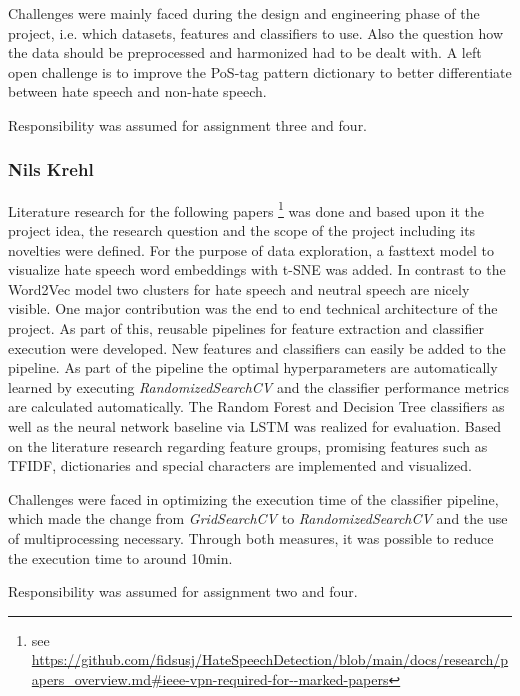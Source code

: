 Challenges were mainly faced during the design and engineering phase of the project, i.e. which datasets, features and classifiers to use. Also the question how the data should be preprocessed and harmonized had to be dealt with. A left open challenge is to improve the PoS-tag pattern dictionary to better differentiate between hate speech and non-hate speech. 

Responsibility was assumed for assignment three and four.

\subsubsection*{Nils Krehl}

Literature research for the following papers \footnote{see \url{https://github.com/fidsusj/HateSpeechDetection/blob/main/docs/research/papers_overview.md\#ieee-vpn-required-for--marked-papers}} was done and based upon it the project idea, the research question and the scope of the project including its novelties were defined. 
For the purpose of data exploration, a fasttext model to visualize hate speech word embeddings with t-SNE was added. In contrast to the Word2Vec model two clusters for hate speech and neutral speech are nicely visible. One major contribution was the end to end technical architecture of the project. As part of this, reusable pipelines for feature extraction and classifier execution were developed. New features and classifiers can easily be added to the pipeline. As part of the pipeline the optimal hy\-per\-pa\-ra\-me\-ters are automatically learned by executing \textit{RandomizedSearchCV} and the classifier performance metrics are calculated automatically. The Random Forest and Decision Tree classifiers as well as the neural network baseline via LSTM was realized for evaluation. Based on the literature research regarding feature groups, promising features such as TFIDF, dictionaries and special characters are implemented and visualized.

Challenges were faced in optimizing the execution time of the classifier pipeline, which made the change from \textit{GridSearchCV} to \textit{RandomizedSearchCV} and the use of multiprocessing necessary. Through both measures, it was possible to reduce the execution time to around 10min.

Responsibility was assumed for assignment two and four.
